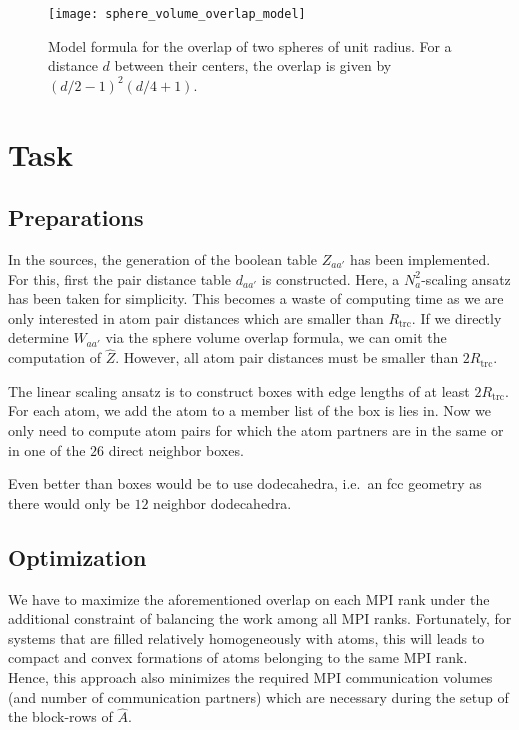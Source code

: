 \documentclass[a4paper]{article}
\newcommand{\MPIrank}{MPI rank} %
\newcommand{\um}[1]{_{\mathrm{#1}}}
\begin{document}
\begin{figure}[h!]
\begin{center}
  \texttt{[image: sphere\_volume\_overlap\_model]}
  \caption{Model formula for the overlap of two spheres of unit radius. 
  For a distance $d$ between their centers, the overlap is given by $(d/2 - 1)^2 (d/4 + 1)$.}
\end{center}
\label{fig:sphere_volume_overlap_model}
\end{figure}

\section{Task}

\subsection{Preparations}

In the sources, the generation of the boolean table $Z_{aa'}$
has been implemented. For this, first the pair distance table $d_{aa'}$ is constructed.
Here, a $N_a^2$-scaling ansatz has been taken for simplicity.
This becomes a waste of computing time as we are only interested in atom pair distances
which are smaller than $R\um{trc}$.
If we directly determine $W_{aa'}$ via the sphere volume overlap formula, 
we can omit the computation of $\hat Z$.
However, all atom pair distances must be smaller than $2R\um{trc}$.

The linear scaling ansatz is to construct boxes with edge lengths of at least $2R\um{trc}$.
For each atom, we add the atom to a member list of the box is lies in.
Now we only need to compute atom pairs for which the atom partners are in the same or 
in one of the $26$ direct neighbor boxes.

Even better than boxes would be to use dodecahedra, 
i.e.~an fcc geometry as there would only be $12$ neighbor dodecahedra.

\subsection{Optimization}

We have to maximize the aforementioned overlap on each \MPIrank{}
under the additional constraint of balancing the work among all \MPIrank{}s.
Fortunately, for systems that are filled relatively homogeneously with atoms,
this will leads to compact and convex formations of atoms belonging to the same \MPIrank{}.
Hence, this approach also minimizes the required MPI communication volumes
(and number of communication partners)
which are necessary during the setup of the block-rows of $\hat A$.
\end{document}
